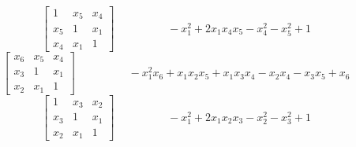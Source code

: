 \documentclass[12pt]{article}
\begin{document}
$$\left[\begin{matrix}1 & x_{5} & x_{4}\\x_{5} & 1 & x_{1}\\x_{4} & x_{1} & 1\end{matrix}\right] \hspace{2cm} - x_{1}^{2} + 2 x_{1} x_{4} x_{5} - x_{4}^{2} - x_{5}^{2} + 1$$
$$\left[\begin{matrix}x_{6} & x_{5} & x_{4}\\x_{3} & 1 & x_{1}\\x_{2} & x_{1} & 1\end{matrix}\right] \hspace{2cm} - x_{1}^{2} x_{6} + x_{1} x_{2} x_{5} + x_{1} x_{3} x_{4} - x_{2} x_{4} - x_{3} x_{5} + x_{6}$$
$$\left[\begin{matrix}1 & x_{3} & x_{2}\\x_{3} & 1 & x_{1}\\x_{2} & x_{1} & 1\end{matrix}\right] \hspace{2cm} - x_{1}^{2} + 2 x_{1} x_{2} x_{3} - x_{2}^{2} - x_{3}^{2} + 1$$
\end{document}
